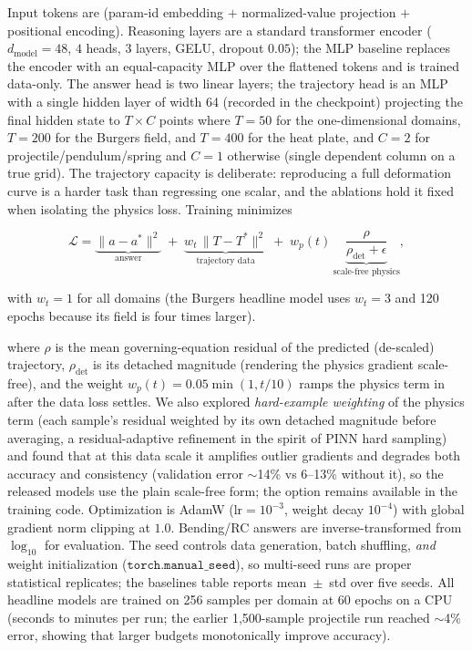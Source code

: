 \documentclass[11pt,a4paper]{article}
\begin{document}
Input tokens are (param-id embedding $+$ normalized-value projection $+$
positional encoding). Reasoning layers are a standard transformer encoder
($d_{\text{model}}=48$, $4$ heads, 3 layers, GELU, dropout $0.05$); the
MLP baseline replaces the encoder with an equal-capacity MLP over the
flattened tokens and is trained data-only. The answer head is two linear
layers; the trajectory head is an MLP with a single hidden layer of width
64 (recorded in the checkpoint) projecting the final hidden state to
$T \times C$ points where $T=50$ for the one-dimensional domains,
$T=200$ for the Burgers field, and $T=400$ for the heat plate, and $C=2$
for projectile/pendulum/spring and
$C=1$ otherwise (single dependent column on a true grid). The trajectory
capacity is deliberate: reproducing a full deformation curve is a harder
task than regressing one scalar, and the ablations hold it fixed when
isolating the physics loss.
Training minimizes

\[
\mathcal{L} = \underbrace{\|a - a^*\|^2}_{\text{answer}} \;+\;
\underbrace{w_t\,\|T - T^*\|^2}_{\text{trajectory data}} \;+\;
w_p(t)\,\underbrace{\frac{\rho}{\rho_{\text{det}} + \epsilon}}_{\text{scale-free physics}},
\]

with $w_t=1$ for all domains (the Burgers headline model uses $w_t=3$ and
120 epochs because its field is four times larger).

where $\rho$ is the mean governing-equation residual of the predicted
(de-scaled) trajectory, $\rho_{\text{det}}$ is its detached magnitude
(rendering the physics gradient scale-free), and the weight
$w_p(t) = 0.05\min(1, t/10)$ ramps the physics term in after the data loss
settles. We also explored \emph{hard-example weighting} of the physics
term (each sample's residual weighted by its own detached magnitude before
averaging, a residual-adaptive refinement in the spirit of PINN hard
sampling) and found that at this data scale it amplifies outlier gradients
and degrades both accuracy and consistency (validation error $\sim$14\%
vs 6--13\% without it), so the released models use the plain scale-free
form; the option remains available in the training code. Optimization is
AdamW ($\mathrm{lr}=10^{-3}$, weight decay $10^{-4}$) with global gradient
norm clipping at $1.0$. Bending/RC
answers are inverse-transformed from $\log_{10}$ for evaluation. The seed
controls data generation, batch shuffling, \emph{and} weight initialization
($\texttt{torch.manual\_seed}$), so multi-seed runs are proper statistical
replicates; the baselines table reports mean~$\pm$~std over five seeds.
All headline models are trained on 256 samples per domain at 60 epochs on a
CPU (seconds to minutes per run; the earlier 1,500-sample projectile run
reached $\sim$4\% error, showing that larger budgets monotonically
improve accuracy).
\end{document}
